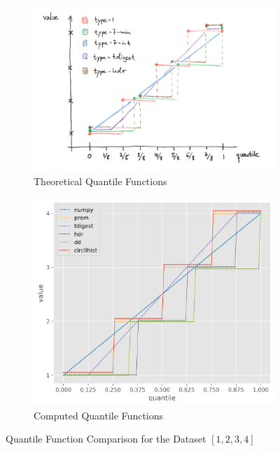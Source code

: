 \documentclass{article}
\theoremstyle{plain}
\theoremstyle{remark}
\begin{document}
\begin{figure}
  \begin{subfigure}{0.5\textwidth}
    \includegraphics[width=\textwidth]{assets/tquant-4.png}
    \caption{Theoretical Quantile Functions}
    \label{fig:tqf}
  \end{subfigure}
  \begin{subfigure}{0.5 \textwidth}
    \includegraphics[width=\textwidth]{evaluation/images/practical_quantile_comparison.png}
    \caption{Computed Quantile Functions}
    \label{fig:pqf}
  \end{subfigure}
  \caption{Quantile Function Comparison for the Dataset $[1,2,3,4]$}
  \label{fig:qf}
\end{figure}
\end{document}
